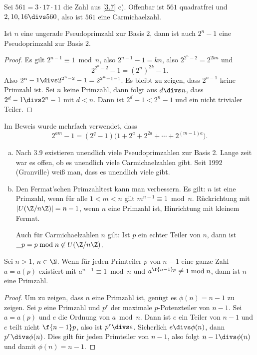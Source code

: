 \begin{ex*}
	Sei $561 = 3 \cdot 17 \cdot 11$ die Zahl aus \ref{3.7} c).
	Offenbar ist $561$ quadratfrei und $2, 10, 16 \divs 560$, also ist $561$ eine Carmichaelzahl.
\end{ex*}

\begin{lem} \label{2.9}
	Ist $n$ eine ungerade Pseudoprimzahl zur Basis $2$, dann ist auch $2^n - 1$ eine Pseudoprimzahl zur Basis $2$.
	\begin{proof}
		Es gilt $2^{n-1} \equiv 1 \bmod n$, also $2^{n-1} - 1 = kn$, also $2^{2^n-2} = 2^{2kn}$ und
		\[
			2^{2^n -2} - 1 = (2^n)^{2k} - 1.
		\]
		Also $2^n - 1 \divs 2^{2^n -2} - 1 = 2^{2^n - 1 - 1}$.
		Es bleibt zu zeigen, dass $2^{n-1}$ keine Primzahl ist.
		Sei $n$ keine Primzahl, dann folgt aus $d \divs n$, dass $2^d - 1 \divs 2^n - 1$ mit $d < n$.
		Dann ist $2^d - 1 < 2^n - 1$ und ein nicht trivialer Teiler.
	\end{proof}
	\begin{note}
		Im Beweis wurde mehrfach verwendet, dass
		\[
			2^{am} - 1
			= (2^q - 1)\Big(1 + 2^a + 2^{2a} + \dotsb + 2^{(m-1)a} \Big).
		\]
	\end{note}
\end{lem}

\begin{nt*}
	\begin{enumerate}[a)]
		\item
			Nach $3.9$ existieren unendlich viele Pseudoprimzahlen zur Basis 2.
			Lange zeit war es offen, ob es unendlich viele Carmichaelzahlen gibt.
			Seit 1992 (Granville) weiß man, dass es unendlich viele gibt.
		\item
			Den Fermat'schen Primzahltest kann man verbessern.
			Es gilt: $n$ ist eine Primzahl, wenn für alle $1 < m < n$ gilt $m^{n-1} \equiv 1 \bmod n$.
			Rückrichtung mit $| U(\Z/n\Z) | = n-1$, wenn $n$ eine Primzahl ist, Hinrichtung mit kleinem Fermat.

			Auch für Carmichaelzahlen $n$ gilt:
			Ist $p$ ein echter Teiler von $n$, dann ist $\_p = p \bmod n \not\in U(\Z / n\Z)$.
	\end{enumerate}
\end{nt*}

\begin{st}[Lucas] \label{3.10}
	Sei $n > 1$, $n \in \N$.
	Wenn für jeden Primteiler $p$ von $n - 1$ eine ganze Zahl $a = a(p)$ existiert mit $a^{n-1} \equiv 1 \bmod n$ und $a^{\f {n-1}p} \not \equiv 1 \bmod n$, dann ist $n$ eine Primzahl.

	\begin{proof}
		Um zu zeigen, dass $n$ eine Primzahl ist, genügt es $\phi(n) = n - 1$ zu zeigen.
		Sei $p$ eine Primzahl und $p^r$ der maximale $p$-Potenzteiler von $n-1$.
		Sei $a = a(p)$ und $e$ die Ordnung von $a \bmod n$.
		Dann ist $e$ ein Teiler von $n-1$ und $e$ teilt nicht $\f {n-1}p$, also ist $p^r \divs e$.
		Sicherlich $e \divs \phi(n)$, dann $p^r \divs \phi(n)$.
		Dies gilt für jeden Primteiler von $n-1$, also folgt $n - 1 \divs \phi(n)$ und damit $\phi(n) = n-1$.
	\end{proof}
\end{st}

